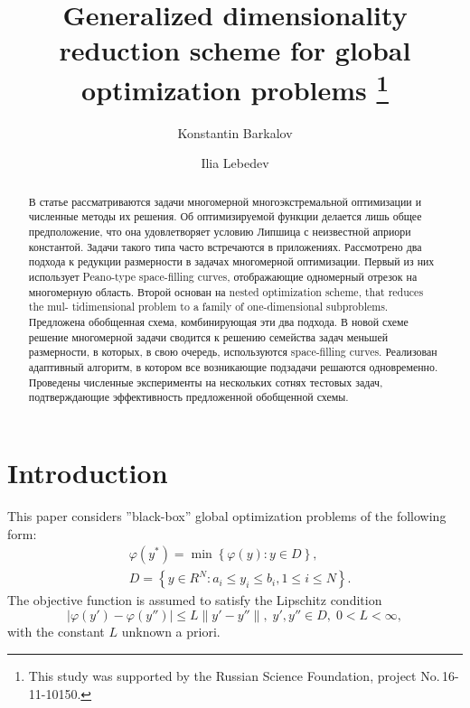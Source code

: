 \documentclass[runningheads]{llncs}
\begin{document}
%
\title{Generalized dimensionality reduction scheme 
for global optimization problems
\thanks{This study was supported by the Russian Science Foundation, project 
No.\,16-11-10150.}}
%
%
\author{Konstantin Barkalov %
\and Ilia Lebedev %
}
%
%
%
\maketitle              %
%
\begin{abstract}

В статье рассматриваются задачи многомерной многоэкстремальной оптимизации и численные методы их решения. Об оптимизируемой функции делается лишь общее предположение, что она удовлетворяет условию Липшица с неизвестной априори константой. Задачи такого типа часто встречаются в приложениях. 
Рассмотрено два подхода к редукции размерности в задачах многомерной оптимизации. Первый из них использует Peano-type space-filling curves, отображающие одномерный отрезок на многомерную область. Второй основан на nested optimization scheme, that reduces the mul- tidimensional problem to a family of one-dimensional subproblems.
Предложена обобщенная схема, комбинирующая эти два подхода. В новой схеме решение многомерной задачи сводится к решению семейства задач меньшей размерности, в которых, в свою очередь, используются space-filling curves. Реализован адаптивный алгоритм, в котором все возникающие подзадачи решаются одновременно. 
Проведены численные эксперименты на нескольких сотнях тестовых задач, подтверждающие эффективность предложенной обобщенной схемы.

\end{abstract}
%
%
%
\section{Introduction}
This paper considers ''black-box'' global optimization problems of the following form:
\begin{eqnarray}\label{main_problem}
& \varphi(y^\ast)=\min{\left\{\varphi(y):y\in D\right\}},\\
& D=\left\{y\in R^N: a_i\leq y_i \leq b_i, 1\leq i \leq N\right\}. \nonumber
\end{eqnarray}
The objective function is assumed to satisfy the Lipschitz condition 
\[
\left|\varphi(y')-\varphi(y'')\right|\leq L\left\|y'-y''\right\|,\; y',y'' \in D,\; 0<L<\infty,
\]
with the constant $L$ unknown a priori.
\end{document}
